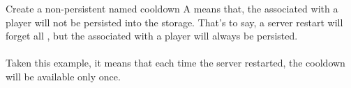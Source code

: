 \begin{example}{Create a non-persistent named cooldown}
    A  means that, the  associated with a player will not be persisted into the storage.
    That's to say, a server restart will forget all , but the  associated with a player will always be persisted.\\
    \\
    Taken this example, it means that each time the server restarted, the cooldown will be available only once.
\end{example}
